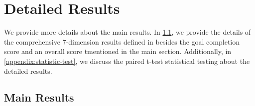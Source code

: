 \appendix
\onecolumn

\section{Detailed Results}
\label{appendix:overall-results}
We provide more details about the main results. In \ref{appendix:main-results}, we provide the details of the comprehensive 7-dimension results defined in \sotopia besides the goal completion score and an overall score tmentioned in the main section. Additionally, in \ref{appendix:statistic-test}, we discuss the paired t-test statistical testing about the detailed results.

\subsection{Main Results}
\label{appendix:main-results}

